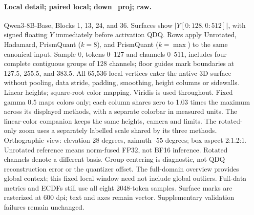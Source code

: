 \paragraph{Local detail; paired local; down\_proj; raw.} Qwen3-8B-Base, Blocks 1, 13, 24, and 36. Surfaces show $|Y[0:128,0:512]|$, with signed floating $Y$ immediately before activation QDQ. Rows apply Unrotated, Hadamard, PrismQuant ($k=8$), and PrismQuant ($k=\max$) to the same canonical input. Sample 0, tokens 0--127 and channels 0--511, includes four complete contiguous groups of 128 channels; floor guides mark boundaries at 127.5, 255.5, and 383.5. All 65,536 local vertices enter the native 3D surface without pooling, data stride, padding, smoothing, height columns or sidewalls. Linear heights; square-root color mapping. Viridis is used throughout. Fixed gamma 0.5 maps colors only; each column shares zero to 1.03 times the maximum across its displayed methods, with a separate colorbar in measured units. The linear-color companion keeps the same heights, camera and limits. The rotated-only zoom uses a separately labelled scale shared by its three methods. Orthographic view: elevation 28 degrees, azimuth -55 degrees; box aspect 2:1.2:1. Unrotated reference means norm-fused FP32, not BF16 inference. Rotated channels denote a different basis. Group centering is diagnostic, not QDQ reconstruction error or the quantizer offset. The full-domain overview provides global context; this fixed local window need not include global outliers. Full-data metrics and ECDFs still use all eight 2048-token samples. Surface marks are rasterized at 600 dpi; text and axes remain vector. Supplementary validation failures remain unchanged.

